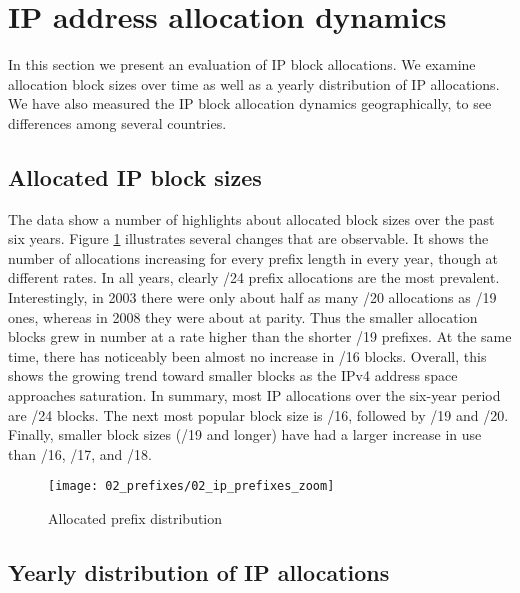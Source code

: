 \section{IP address allocation dynamics}
\label{sec:allocations}

In this section we present an evaluation of IP block allocations. We examine
allocation block sizes over time as well as a yearly distribution of IP
allocations. We have also measured the IP block allocation dynamics
geographically, to see differences among several countries.

\subsection{Allocated IP block sizes}

The data show a number of highlights about allocated block sizes over the past
six years. Figure \ref{fig:IP allocations} illustrates several changes that are
observable. It shows the number of allocations increasing for every prefix
length in every year, though at different rates. In all years, clearly /24
prefix allocations are the most prevalent. Interestingly, in 2003 there were
only about half as many /20 allocations as /19 ones, whereas in 2008 they were
about at parity. Thus the smaller allocation blocks grew in number at a rate
higher than the shorter /19 prefixes. At the same time, there has noticeably
been almost no increase in /16 blocks. Overall, this shows the growing trend
toward smaller blocks as the IPv4 address space approaches saturation. In
summary, most IP allocations over the six-year period are /24 blocks. The next
most popular block size is /16, followed by /19 and /20. Finally, smaller block
sizes (/19 and longer) have had a larger increase in use than /16, /17, and
/18.

\begin{figure}[htbp]
 	\centering
 		\texttt{[image: 02\_prefixes/02\_ip\_prefixes\_zoom]}
	\caption{Allocated prefix distribution}
 	\label{fig:IP allocations}
\end{figure}

\subsection{Yearly distribution of IP allocations}


